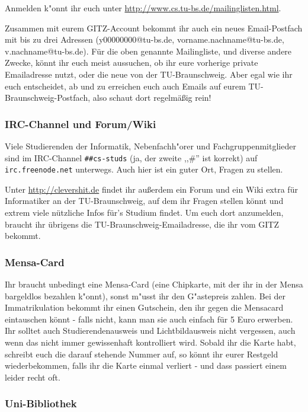 Anmelden k"onnt ihr euch unter
\url{http://www.cs.tu-bs.de/mailinglisten.html}.

Zusammen mit eurem GITZ-Account bekommt ihr auch ein neues 
Email-Postfach mit bis zu drei Adressen (y00000000@tu-bs.de, 
vorname.nachname@tu-bs.de, v.nachname@tu-bs.de). Für die oben 
genannte Mailingliste, und diverse andere Zwecke, könnt ihr euch 
meist aussuchen, ob ihr eure vorherige private Emailadresse nutzt, 
oder die neue von der TU-Braunschweig. Aber egal wie ihr euch 
entscheidet, ab und zu erreichen euch auch Emails auf eurem 
TU-Braunschweig-Postfach, also schaut dort regelmäßig rein!

\subsubsection{IRC-Channel und Forum/Wiki}

Viele Studierenden der Informatik, Nebenfachh"orer und
Fachgruppenmitglieder sind im IRC-Channel \texttt{\#\#cs-studs}
(ja, der zweite ,,\#'' ist korrekt) auf \texttt{irc.freenode.net}
unterwegs. Auch hier ist ein guter Ort, Fragen zu stellen.

Unter \url{http://clevershit.de} findet ihr außerdem ein Forum und ein 
Wiki extra für Informatiker an der TU-Braunschweig, auf dem ihr Fragen 
stellen könnt und extrem viele nützliche Infos für's Studium findet. Um 
euch dort anzumelden, braucht ihr übrigens die TU-Braunschweig-Emailadresse, 
die ihr vom GITZ bekommt.

\subsubsection{Mensa-Card}

Ihr braucht unbedingt eine Mensa-Card (eine Chipkarte,
mit der ihr in der Mensa bargeldlos bezahlen k"onnt), sonst
m"usst ihr den G"astepreis zahlen. Bei der Immatrikulation bekommt ihr 
einen Gutschein, den ihr gegen die Mensacard eintauschen könnt - falls 
nicht, kann man sie auch einfach für 5 Euro erwerben. Ihr solltet auch 
Studierendenausweis und Lichtbildausweis nicht vergessen, auch wenn 
das nicht immer gewissenhaft kontrolliert wird. Sobald ihr die Karte 
habt, schreibt euch die darauf stehende Nummer auf, so könnt ihr eurer 
Restgeld wiederbekommen, falls ihr die Karte einmal verliert - und dass 
passiert einem leider recht oft.

\subsubsection{Uni-Bibliothek}

